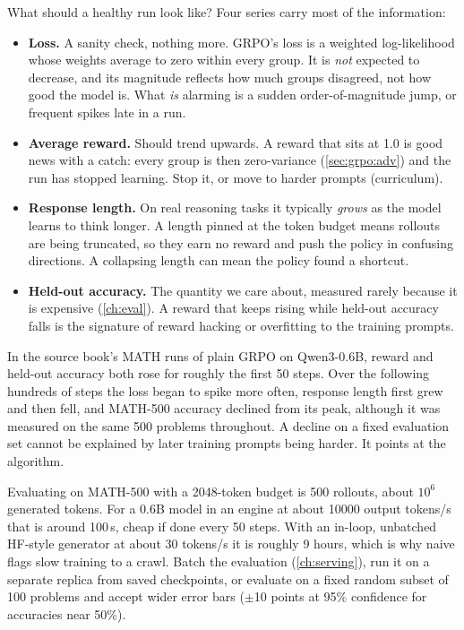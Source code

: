What should a healthy run look like? Four series carry most of the information:
\begin{itemize}
\item \textbf{Loss.} A sanity check, nothing more. GRPO's loss is a weighted
log-likelihood whose weights average to zero within every group. It is \emph{not} expected
to decrease, and its magnitude reflects how much groups disagreed, not how good the
model is. What \emph{is} alarming is a sudden order-of-magnitude jump, or frequent spikes
late in a run.
\item \textbf{Average reward.} Should trend upwards. A reward that sits at 1.0 is good news
with a catch: every group is then zero-variance (\cref{sec:grpo:adv}) and the run has stopped
learning. Stop it, or move to harder prompts (curriculum).
\item \textbf{Response length.} On real reasoning tasks it typically \emph{grows} as the
model learns to think longer. A length pinned at the token budget means rollouts are being
truncated, so they earn no reward and push the policy in confusing directions. A collapsing
length can mean the policy found a shortcut.
\item \textbf{Held-out accuracy.} The quantity we care about, measured rarely because it is
expensive (\cref{ch:eval}). A reward that keeps rising while held-out accuracy falls is the
signature of reward hacking or overfitting to the training prompts.
\end{itemize}
In the source book's MATH runs of plain GRPO on Qwen3-0.6B, reward and held-out accuracy
both rose for roughly the first 50 steps. Over the following hundreds of steps the loss
began to spike more often, response length first grew and then fell, and MATH-500
accuracy declined from its peak, although it was measured on the same 500 problems
throughout. A decline on a fixed evaluation set cannot be explained by later training
prompts being harder. It points at the algorithm.

\begin{napkinmath}
Evaluating on MATH-500 with a 2048-token budget is 500 rollouts, about $10^6$ generated
tokens. For a 0.6B model in an engine at about \num{10000} output tokens/s that is around 100\,s,
cheap if done every 50 steps. With an in-loop, unbatched HF-style generator at about 30 tokens/s
it is roughly 9 hours, which is why naive  flags slow training to a crawl.
Batch the evaluation (\cref{ch:serving}), run it on a separate replica from saved
checkpoints, or evaluate on a fixed random subset of 100 problems and accept wider error
bars ($\pm$10 points at 95\% confidence for accuracies near 50\%).
\end{napkinmath}

